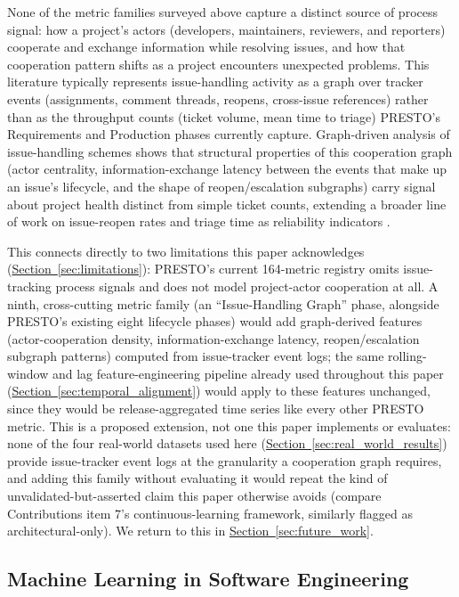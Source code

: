 \documentclass[technologies,article,submit,pdftex,moreauthors]{Definitions/mdpi}
\begin{document}
None of the metric families surveyed above capture a distinct source of process signal: how a project's actors (developers, maintainers, reviewers, and reporters) cooperate and exchange information while resolving issues, and how that cooperation pattern shifts as a project encounters unexpected problems. This literature typically represents issue-handling activity as a graph over tracker events (assignments, comment threads, reopens, cross-issue references) rather than as the throughput counts (ticket volume, mean time to triage) PRESTO's Requirements and Production phases currently capture. Graph-driven analysis of issue-handling schemes \citep{issuehandling2024} shows that structural properties of this cooperation graph (actor centrality, information-exchange latency between the events that make up an issue's lifecycle, and the shape of reopen/escalation subgraphs) carry signal about project health distinct from simple ticket counts, extending a broader line of work on issue-reopen rates and triage time as reliability indicators \citep{ostrand2002}.

This connects directly to two limitations this paper acknowledges (\hyperref[sec:limitations]{Section~\ref*{sec:limitations}}): PRESTO's current 164-metric registry omits issue-tracking process signals and does not model project-actor cooperation at all. A ninth, cross-cutting metric family (an ``Issue-Handling Graph'' phase, alongside PRESTO's existing eight lifecycle phases) would add graph-derived features (actor-cooperation density, information-exchange latency, reopen/escalation subgraph patterns) computed from issue-tracker event logs; the same rolling-window and lag feature-engineering pipeline already used throughout this paper (\hyperref[sec:temporal_alignment]{Section~\ref*{sec:temporal_alignment}}) would apply to these features unchanged, since they would be release-aggregated time series like every other PRESTO metric. This is a proposed extension, not one this paper implements or evaluates: none of the four real-world datasets used here (\hyperref[sec:real_world_results]{Section~\ref*{sec:real_world_results}}) provide issue-tracker event logs at the granularity a cooperation graph requires, and adding this family without evaluating it would repeat the kind of unvalidated-but-asserted claim this paper otherwise avoids (compare Contributions item 7's continuous-learning framework, similarly flagged as architectural-only). We return to this in \hyperref[sec:future_work]{Section~\ref*{sec:future_work}}.

\subsection{Machine Learning in Software Engineering}\label{sec:rw_ml}
\end{document}
